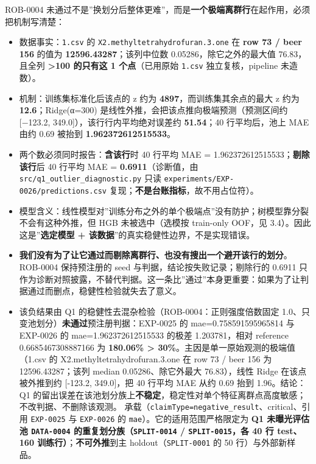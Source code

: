 \documentclass[
  11pt,
]{ctexart}
\providecommand{\tightlist}{%
  \setlength{\itemsep}{0pt}\setlength{\parskip}{0pt}}
\begin{document}
ROB-0004
未通过不是''换划分后整体更难''，而是\textbf{一个极端离群行}在起作用，必须把机制写清楚：

\begin{itemize}
\tightlist
\item
  数据事实：\texttt{1.csv} 的 \texttt{X2.\allowbreak{}methyltetrahydrofuran.\allowbreak{}3.\allowbreak{}one} 在
  \textbf{row 73 / beer 156} 的值为 \textbf{12596.43287}；该列中位数
  0.05286，除它之外的最大值 76.83，且全列 \textbf{\textgreater100
  的只有这 1 个点}（已用原始 \texttt{1.csv} 独立复核，pipeline
  未造数）。
\item
  机制：训练集标准化后该点的 \textbar z\textbar{} 约为
  \textbf{4897}，而训练集其余点的最大 \textbar z\textbar{} 约为
  \textbf{12.6}；Ridge(α=300)
  是线性外推，会把该点推向极端预测（预测区间约 {[}−123.2,
  349.0{]}），该行行内平均绝对误差约 \textbf{51.54}；40 行平均后，池上
  MAE 由约 0.69 被抬到 \textbf{1.962372612515533}。
\item
  两个数必须同时报告：\textbf{含该行}时 40 行平均 MAE =
  1.962372612515533；\textbf{剔除该行}后 40 行平均 MAE =
  \textbf{0.6911}（诊断值，由 \texttt{src/\allowbreak{}q1\_\allowbreak{}outlier\_\allowbreak{}diagnostic.\allowbreak{}py}
  只读 \texttt{experiments/\allowbreak{}EXP-0026/\allowbreak{}predictions.\allowbreak{}csv}
  复现；\textbf{不是台账指标}，故不用占位符）。
\item
  模型含义：线性模型对''训练分布之外的单个极端点''没有防护；树模型靠分裂不会有这种外推，但
  HGB 未被选中（选模按 train-only OOF，见
  3.4）。因此这是''\textbf{选定模型 +
  该数据}''的真实稳健性边界，不是实现错误。
\item
  \textbf{我们没有为了让它通过而剔除离群行、也没有搜出一个避开该行的划分}。ROB-0004
  保持预注册的 seed 与判据，结论按失败记录；剔除行的 0.6911
  只作为诊断对照披露，不替代判据。这一条比''通过''本身更重要：如果为了让判据通过而删点，稳健性检验就失去了意义。
\item
  该负结果由 Q1 的稳健性去混杂检验（ROB-0004：正则强度倍数固定
  1.0、只变池划分）\textbf{未通过}预注册判据：EXP-0025 的
  mae=0.758591595965814 与 EXP-0026 的 mae=1.962372612515533 的极差
  1.203781，相对 reference 0.6685467308887166 为 \textbf{180.06\%
  \textgreater{} 30\%}。主因是单一原始观测的极端值（1.csv 的
  X2.methyltetrahydrofuran.3.one 在 row 73 / beer 156 为
  12596.43287；该列 median 0.05286、除它外最大 76.83），线性 Ridge
  在该点被外推到约 {[}-123.2, 349.0{]}，把 40 行平均 MAE 从约 0.69 抬到
  1.96。结论：Q1
  的留出误差在该池划分族上\textbf{不稳定}，稳定性对单个特征离群点高度敏感；不改判据、不删除该观测。
  承载（\texttt{claimType=negative\_\allowbreak{}result}、critical、引用
  \texttt{EXP-0025} 与 \texttt{EXP-0026} 的
  \texttt{mae}）。它的适用范围严格限定为 \textbf{Q1 未曝光评估池
  \texttt{DATA-0004} 的重复划分族（\texttt{SPLIT-0014} /
  \texttt{SPLIT-0015}，各 40 行 test、160
  训练行）}；\textbf{不可外推}到主 holdout（\texttt{SPLIT-0001} 的 50
  行）与外部新样品。
\end{itemize}
\end{document}
